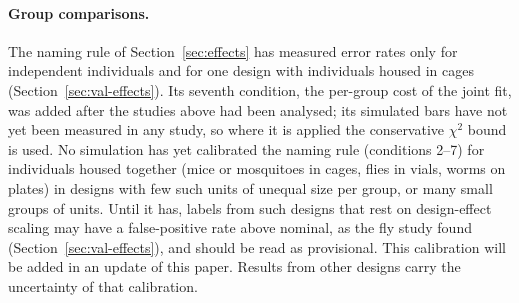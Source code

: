 \paragraph{Group comparisons.} The naming rule of Section~\ref{sec:effects} has measured error rates only for
independent individuals and for one design with individuals housed in cages (Section~\ref{sec:val-effects}). Its
seventh condition, the per-group cost of the joint fit, was added after the studies above had been analysed; its
simulated bars have not yet been measured in any study, so where it is applied the conservative $\chi^2$ bound is used.
No simulation has yet calibrated the naming rule (conditions 2--7) for individuals housed together (mice or mosquitoes in cages,
flies in vials, worms on plates) in designs with few such units of unequal size per group, or many small groups of units. Until it has, labels from such
designs that rest on design-effect scaling may have a false-positive rate above nominal, as the fly study found
(Section~\ref{sec:val-effects}), and should be read as provisional. This calibration will be added in an update of this paper. Results from other designs carry
the uncertainty of that calibration.
